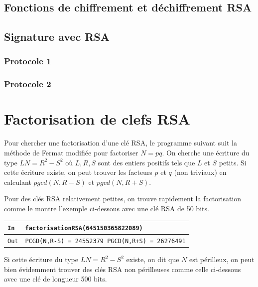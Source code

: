 \documentclass[titlepage]{article}
\begin{document}
    \subsection{Fonctions de chiffrement et déchiffrement RSA}

    \subsection{Signature avec RSA}
    \subsubsection{Protocole 1}
    \subsubsection{Protocole 2}

    \section{Factorisation de clefs RSA}
    Pour chercher une factorisation d'une clé RSA, le programme suivant suit la méthode de Fermat modifiée pour factoriser $N = pq$.
    On cherche une écriture du type $LN = R^2 - S^2$ où $L,R,S$ sont des entiers positifs tels que $L$ et $S$ petits.
    Si cette écriture existe, on peut trouver les facteurs $p$ et $q$ (non triviaux) en calculant $pgcd(N,R-S)$ et $ pgcd(N,R+S)$.

    

    Pour des clés RSA relativement petites, on trouve rapidement la factorisation comme le montre l'exemple ci-dessous avec une clé RSA de 50 bits. \bigbreak

    \begin{tabularx}{12cm}{|p{0.60cm}|X|}
        \hline
        \rowcolor{gray}
        \texttt{In}
        & 
        \texttt{factorisationRSA(645150365822089)}
        \\
        \hline
        \texttt{Out}
        &
        \texttt{PCGD(N,R-S) =  24552379 \newline
        PGCD(N,R+S) =  26276491}
        \\
        \hline
    \end{tabularx}
    \bigbreak
    
    Si cette écriture du type $LN = R^2 - S^2$ existe, on dit que $N$ est périlleux, on peut bien évidemment trouver des clés RSA non périlleuses comme celle ci-dessous avec une clé de longueur 500 bits.\bigbreak
    
\end{document}
